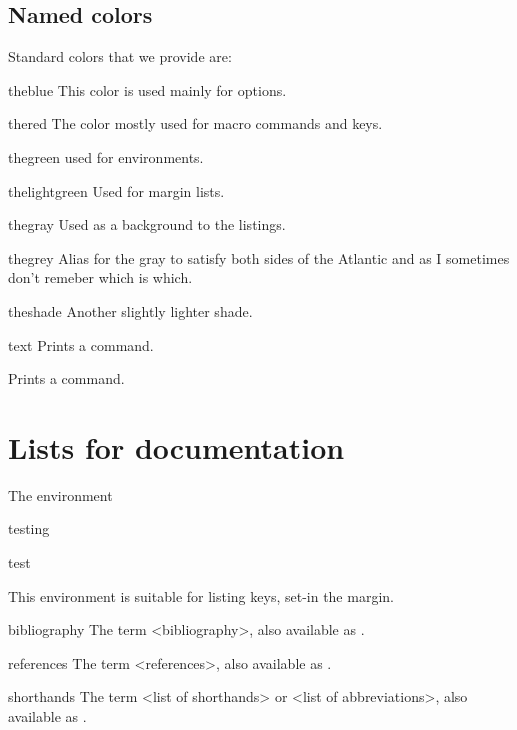 \subsection{Named colors}
Standard colors that we provide are:
\begin{marglist}
\item [\textcolor{theblue}{theblue}] This color is used mainly for options.
\item [\textcolor{thered}{thered}] The color mostly used for macro commands and keys.
\item [\textcolor{thegreen}{thegreen}] used for environments.
\item [\textcolor{thelightgreen}{thelightgreen}] Used for margin lists.
\item [\textcolor{thegray}{thegray}] Used as a background to the listings.
\item [\colorbox{thegrey}{\color{white}thegrey}] Alias for the gray to satisfy both sides of the Atlantic and as I sometimes don't remeber which is which.
\item [\colorbox{theshade}{theshade}] Another slightly lighter shade.
\end{marglist}



\begin{marglist}
\item [\cs{cs}]  text Prints a command.
\item [\cs{cmd}] Prints a command.
\end{marglist}




\section{Lists for documentation}



The environment 
\begin{marglist}
\item[testing]\lorem
\item [test]\lorem
\end{marglist}

This environment is suitable for listing keys, set-in the margin.

\begin{keymarglist}
\item[bibliography] The term <bibliography>, also available as \cmd{\bibname}.
\item[references] The term <references>, also available as .
\item[shorthands] The term <list of shorthands> or <list of abbreviations>, also available as .
\end{keymarglist}


